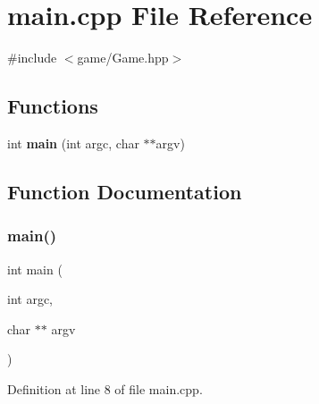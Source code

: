 \section{main.\+cpp File Reference}
\label{main_8cpp}
{\ttfamily \#include $<$game/\+Game.\+hpp$>$}\newline
\subsection*{Functions}
\begin{DoxyCompactItemize}
\item 
int \textbf{ main} (int argc, char $\ast$$\ast$argv)
\end{DoxyCompactItemize}


\subsection{Function Documentation}
\mbox{\label{main_8cpp_a3c04138a5bfe5d72780bb7e82a18e627}} 
\subsubsection{main()}
{\footnotesize\ttfamily int main (\begin{DoxyParamCaption}\item[{int}]{argc,  }\item[{char $\ast$$\ast$}]{argv }\end{DoxyParamCaption})}



Definition at line 8 of file main.\+cpp.

